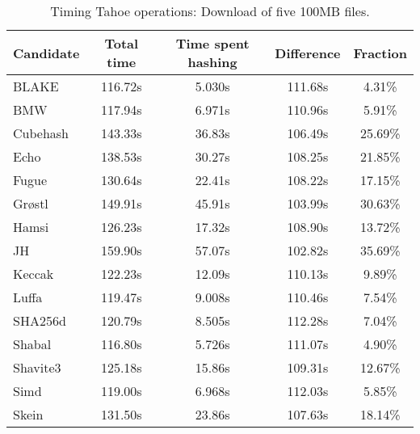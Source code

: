 \begin{table}[h]
  \centering
  \caption{Timing Tahoe operations: Download of five 100MB files.}
  \begin{tabular}{ | l | c | c | c | c | }
    \hline
    Candidate & Total time & Time spent hashing & Difference & Fraction \\ \hline
    BLAKE     &  116.72s  &  5.030s  &  111.68s  &  4.31\%   \\  \hline
    BMW       &  117.94s  &  6.971s  &  110.96s  &  5.91\%   \\  \hline
    Cubehash  &  143.33s  &  36.83s  &  106.49s  &  25.69\%  \\  \hline
    Echo      &  138.53s  &  30.27s  &  108.25s  &  21.85\%  \\  \hline
    Fugue     &  130.64s  &  22.41s  &  108.22s  &  17.15\%  \\  \hline
    Grøstl    &  149.91s  &  45.91s  &  103.99s  &  30.63\%  \\  \hline
    Hamsi     &  126.23s  &  17.32s  &  108.90s  &  13.72\%  \\  \hline
    JH        &  159.90s  &  57.07s  &  102.82s  &  35.69\%  \\  \hline
    Keccak    &  122.23s  &  12.09s  &  110.13s  &  9.89\%   \\  \hline
    Luffa     &  119.47s  &  9.008s  &  110.46s  &  7.54\%   \\  \hline
    SHA256d   &  120.79s  &  8.505s  &  112.28s  &  7.04\%   \\  \hline
    Shabal    &  116.80s  &  5.726s  &  111.07s  &  4.90\%   \\  \hline
    Shavite3  &  125.18s  &  15.86s  &  109.31s  &  12.67\%  \\  \hline
    Simd      &  119.00s  &  6.968s  &  112.03s  &  5.85\%   \\  \hline
    Skein     &  131.50s  &  23.86s  &  107.63s  &  18.14\%  \\  \hline
  \end{tabular}
  \label{tbl:hashingtimes:get100mb}
\end{table}
